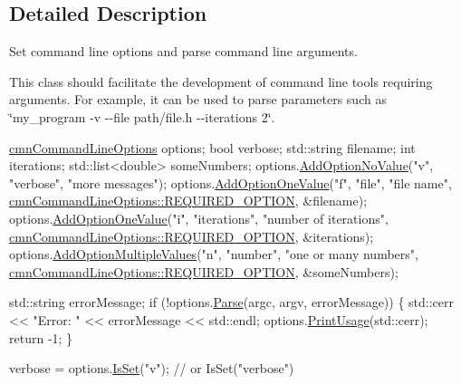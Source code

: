 \subsection{Detailed Description}
Set command line options and parse command line arguments. 

This class should facilitate the development of command line tools requiring arguments. For example, it can be used to parse parameters such as \char`\"{}my\+\_\+program -\/v -\/-\/file path/file.\+h -\/-\/iterations 2\char`\"{}.


\begin{DoxyCode}
\hyperlink{classcmn_command_line_options}{cmnCommandLineOptions} options;
\textcolor{keywordtype}{bool} verbose;
std::string filename;
\textcolor{keywordtype}{int} iterations;
std::list<double> someNumbers;
options.\hyperlink{classcmn_command_line_options_a7d8292a0b9cfcdc97591f55c41598ba5}{AddOptionNoValue}(\textcolor{stringliteral}{"v"}, \textcolor{stringliteral}{"verbose"}, \textcolor{stringliteral}{"more messages"});
options.\hyperlink{classcmn_command_line_options_af51a9e7df4d689c7de4daeebce7d313b}{AddOptionOneValue}(\textcolor{stringliteral}{"f"}, \textcolor{stringliteral}{"file"}, \textcolor{stringliteral}{"file name"}, 
      \hyperlink{group__cisst_common_ggac239a3ca62dd4e3b391824f6f1a97c76a18dad98cb48d91b0fe8ee13a54dc45ff}{cmnCommandLineOptions::REQUIRED\_OPTION}, &filename);
options.\hyperlink{classcmn_command_line_options_af51a9e7df4d689c7de4daeebce7d313b}{AddOptionOneValue}(\textcolor{stringliteral}{"i"}, \textcolor{stringliteral}{"iterations"}, \textcolor{stringliteral}{"number of iterations"}, 
      \hyperlink{group__cisst_common_ggac239a3ca62dd4e3b391824f6f1a97c76a18dad98cb48d91b0fe8ee13a54dc45ff}{cmnCommandLineOptions::REQUIRED\_OPTION}, &iterations);
options.\hyperlink{classcmn_command_line_options_ae8fa287fe01d51d1eb8fdda682b07f26}{AddOptionMultipleValues}(\textcolor{stringliteral}{"n"}, \textcolor{stringliteral}{"number"}, \textcolor{stringliteral}{"one or many numbers"}, 
      \hyperlink{group__cisst_common_ggac239a3ca62dd4e3b391824f6f1a97c76a18dad98cb48d91b0fe8ee13a54dc45ff}{cmnCommandLineOptions::REQUIRED\_OPTION}, &someNumbers);

std::string errorMessage;
\textcolor{keywordflow}{if} (!options.\hyperlink{classcmn_command_line_options_a7e6a6a950b408e0769ce9194d9cb65b5}{Parse}(argc, argv, errorMessage)) \{
    std::cerr << \textcolor{stringliteral}{"Error: "} << errorMessage << std::endl;
    options.\hyperlink{classcmn_command_line_options_a09d9261f50374d6178ab8865a16cad99}{PrintUsage}(std::cerr);
    \textcolor{keywordflow}{return} -1;
\}

verbose = options.\hyperlink{classcmn_command_line_options_aba78eaaa4cd80f68e5c64649bae98931}{IsSet}(\textcolor{stringliteral}{"v"}); \textcolor{comment}{// or IsSet("verbose")}
\end{DoxyCode}



